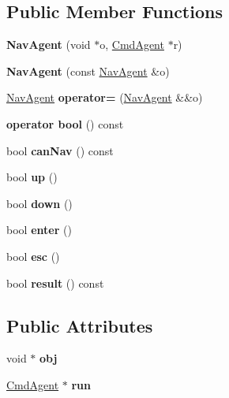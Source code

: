 \subsection*{Public Member Functions}
\begin{DoxyCompactItemize}
\item 
\mbox{\label{structNavAgent_ab1040e3019d1b47d64727a606c41436f}} 
{\bfseries Nav\+Agent} (void $\ast$o, \hyperlink{structCmdAgent}{Cmd\+Agent} $\ast$r)
\item 
\mbox{\label{structNavAgent_a26cd7189c220d855ac814de8d0beaa05}} 
{\bfseries Nav\+Agent} (const \hyperlink{structNavAgent}{Nav\+Agent} \&o)
\item 
\mbox{\label{structNavAgent_a6daf32fef333fa9a479c51270362ceb7}} 
\hyperlink{structNavAgent}{Nav\+Agent} {\bfseries operator=} (\hyperlink{structNavAgent}{Nav\+Agent} \&\&o)
\item 
\mbox{\label{structNavAgent_a4b15b07c152a0dc5348c88ca1595c6d5}} 
{\bfseries operator bool} () const
\item 
\mbox{\label{structNavAgent_a4bab30c7db65ca0023d1cfbda8459fdd}} 
bool {\bfseries can\+Nav} () const
\item 
\mbox{\label{structNavAgent_ad7922b692ca111e47ca603bd9c578297}} 
bool {\bfseries up} ()
\item 
\mbox{\label{structNavAgent_ab39959e3b1a2b958dfa6a15f6d1ce864}} 
bool {\bfseries down} ()
\item 
\mbox{\label{structNavAgent_abbf23487e6d44743f6a16611cc003511}} 
bool {\bfseries enter} ()
\item 
\mbox{\label{structNavAgent_a024b5b6266837683569606acd2fab5ed}} 
bool {\bfseries esc} ()
\item 
\mbox{\label{structNavAgent_a953668fa3d7517c4fa6c1d54b4d7e551}} 
bool {\bfseries result} () const
\end{DoxyCompactItemize}
\subsection*{Public Attributes}
\begin{DoxyCompactItemize}
\item 
\mbox{\label{structNavAgent_a5c9a3c69aa8811b13b8a1baab9e638d6}} 
void $\ast$ {\bfseries obj}
\item 
\mbox{\label{structNavAgent_a546c2683e672c82fdb3f9d1a3f444f94}} 
\hyperlink{structCmdAgent}{Cmd\+Agent} $\ast$ {\bfseries run}
\end{DoxyCompactItemize}


